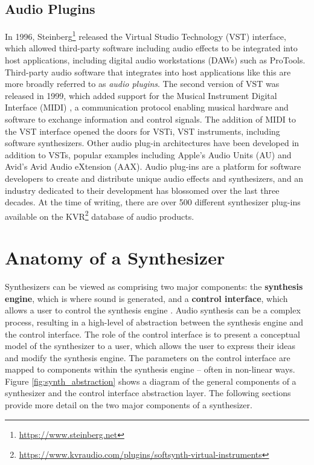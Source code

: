 \subsection{Audio Plugins}
In 1996, Steinberg\footnote{\url{https://www.steinberg.net}} released the Virtual Studio Technology (VST) interface, which allowed third-party software including audio effects to be integrated into host applications, including digital audio workstations (DAWs) such as ProTools. Third-party audio software that integrates into host applications like this are more broadly referred to as \textit{audio plugins}. The second version of VST was released in 1999, which added support for the Musical Instrument Digital Interface (MIDI) \cite{rothstein1992midi}, a communication protocol enabling musical hardware and software to exchange information and control signals. The addition of MIDI to the VST interface opened the doors for VSTi, VST instruments, including software synthesizers. Other audio plug-in architectures have been developed in addition to VSTs, popular examples including Apple's Audio Units (AU) and Avid's Avid Audio eXtension (AAX). Audio plug-ins are a platform for software developers to create and distribute unique audio effects and synthesizers, and an industry dedicated to their development has blossomed over the last three decades. At the time of writing, there are over 500 different synthesizer plug-ins available on the KVR\footnote{\url{https://www.kvraudio.com/plugins/softsynth-virtual-instruments}} database of audio products.

\section{Anatomy of a Synthesizer}
\label{section:synth-anatomy}

Synthesizers can be viewed as comprising two major components: the \textbf{synthesis engine}, which is where sound is generated, and a \textbf{control interface}, which allows a user to control the synthesis engine \cite{russ2012sound}. Audio synthesis can be a complex process, resulting in a high-level of abstraction between the synthesis engine and the control interface. The role of the control interface is to present a conceptual model of the synthesizer to a user, which allows the user to express their ideas and modify the synthesis engine. The parameters on the control interface are mapped to components within the synthesis engine -- often in non-linear ways. Figure \ref{fig:synth_abstraction} shows a diagram of the general components of a synthesizer and the control interface abstraction layer. The following sections provide more detail on the two major components of a synthesizer.

